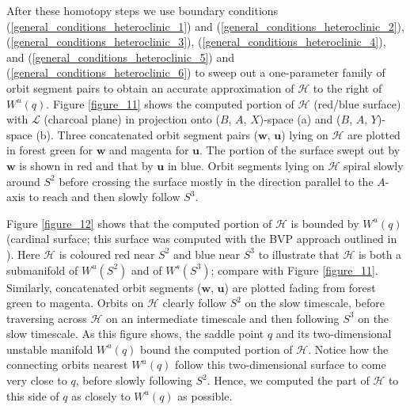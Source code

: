 \documentclass{ws-ijbc}
\begin{document}
After these homotopy steps we use boundary conditions (\ref{general_conditions_heteroclinic_1}) and (\ref{general_conditions_heteroclinic_2}), (\ref{general_conditions_heteroclinic_3}), (\ref{general_conditions_heteroclinic_4}), and (\ref{general_conditions_heteroclinic_5}) and (\ref{general_conditions_heteroclinic_6}) to sweep out a one-parameter family of orbit segment pairs to obtain an accurate approximation of $\mathscr{H}$ to the right of $W^u(q)$.  Figure \ref{figure_11} shows the computed portion of $\mathscr{H}$ (red/blue surface) with $\mathscr{L}$ (charcoal plane) in projection onto ($B$, $A$, $X$)-space (a) and ($B$, $A$, $Y$)-space (b).  Three concatenated orbit segment pairs ($\mathbf{w}$, $\mathbf{u}$) lying on $\mathscr{H}$ are plotted in forest green for $\mathbf{w}$ and magenta for $\mathbf{u}$.  The portion of the surface swept out by $\mathbf{w}$ is shown in red and that by $\mathbf{u}$ in blue.  Orbit segments lying on $\mathscr{H}$ spiral slowly around $S^2$ before crossing the surface mostly in the direction parallel to the $A$-axis to reach and then slowly follow $S^3$.

Figure \ref{figure_12} shows that the computed portion of $\mathscr{H}$ is bounded by $W^u(q)$ (cardinal surface; this surface was computed with the BVP approach outlined in \cite{Red_book}).  Here $\mathscr{H}$ is coloured red near $S^2$ and blue near $S^3$ to illustrate that $\mathscr{H}$ is both a submanifold of $W^u(S^2)$ and of $W^s(S^3)$; compare with Figure \ref{figure_11}.  Similarly, concatenated orbit segments ($\mathbf{w}$, $\mathbf{u}$) are plotted fading from forest green to magenta.  Orbits on $\mathscr{H}$ clearly follow $S^2$ on the slow timescale, before traversing across $\mathscr{H}$ on an intermediate timescale and then following $S^3$ on the slow timescale.  As this figure shows, the saddle point $q$ and its two-dimensional unstable manifold $W^u(q)$ bound the computed portion of $\mathscr{H}$.  Notice how the connecting orbits nearest $W^u(q)$ follow this two-dimensional surface to come very close to $q$, before slowly following $S^2$. Hence, we computed the part of $\mathscr{H}$ to this side of $q$ as closely to $W^u(q)$ as possible.
\end{document}
